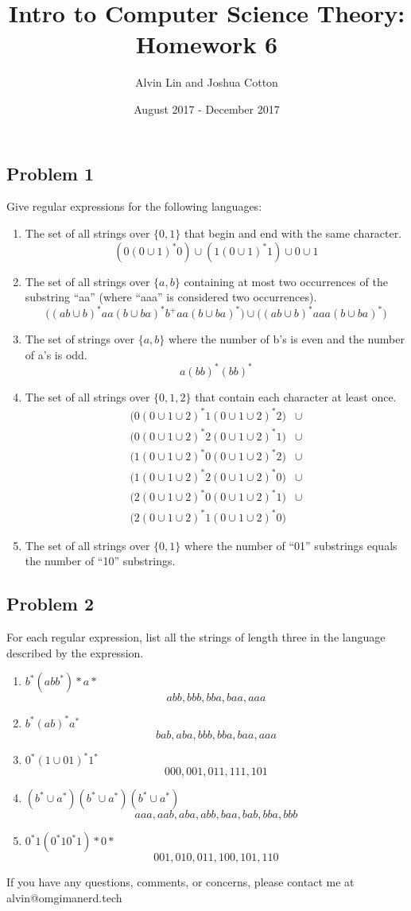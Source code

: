 \documentclass[letterpaper, 12pt]{math}
\title{Intro to Computer Science Theory: Homework 6}
\author{Alvin Lin and Joshua Cotton}
\date{August 2017 - December 2017}
\begin{document}
\maketitle

\subsection*{Problem 1}
Give regular expressions for the following languages:
\begin{enumerate}
  \item The set of all strings over \( \{0,1\} \) that begin and end with the
  same character.
  \[ (0(0\cup1)^*0)\cup(1(0\cup1)^*1)\cup0\cup1 \]
  \item The set of all strings over \( \{a,b\} \) containing at most two
  occurrences of the substring ``aa'' (where ``aaa'' is considered two
  occurrences).
  \[ \bigg((ab\cup b)^*aa(b\cup ba)^*b^+aa(b\cup ba)^*\bigg)\cup
    \bigg((ab\cup b)^*aaa(b\cup ba)^*\bigg) \]
  \item The set of strings over \( \{a,b\} \) where the number of b's is even
  and the number of a's is odd.
  \[ a(bb)^*(bb)^* \]
  \item The set of all strings over \( \{0,1,2\} \) that contain each character
  at least once.
  \begin{align*}
    \bigg(0(0\cup1\cup2)^*1(0\cup1\cup2)^*2\bigg) &\cup \\
    \bigg(0(0\cup1\cup2)^*2(0\cup1\cup2)^*1\bigg) &\cup \\
    \bigg(1(0\cup1\cup2)^*0(0\cup1\cup2)^*2\bigg) &\cup \\
    \bigg(1(0\cup1\cup2)^*2(0\cup1\cup2)^*0\bigg) &\cup \\
    \bigg(2(0\cup1\cup2)^*0(0\cup1\cup2)^*1\bigg) &\cup \\
    \bigg(2(0\cup1\cup2)^*1(0\cup1\cup2)^*0\bigg)
  \end{align*}
  \item The set of all strings over \( \{0,1\} \) where the number of ``01''
  substrings equals the number of ``10'' substrings.
\end{enumerate}

\subsection*{Problem 2}
For each regular expression, list all the strings of length three in the
language described by the expression.
\begin{enumerate}
  \item \( b^*(abb^*)*a* \)
  \[ abb, bbb, bba, baa, aaa \]
  \item \( b^*(ab)^*a^* \)
  \[ bab, aba, bbb, bba, baa, aaa \]
  \item \( 0^*(1\cup01)^*1^* \)
  \[ 000, 001, 011, 111, 101 \]
  \item \( (b^*\cup a^*)(b^*\cup a^*)(b^*\cup a^*) \)
  \[ aaa, aab, aba, abb, baa, bab, bba, bbb \]
  \item \( 0^*1(0^*10^*1)*0* \)
  \[ 001, 010, 011, 100, 101, 110 \]
\end{enumerate}

\begin{center}
  If you have any questions, comments, or concerns, please contact me at
  alvin@omgimanerd.tech
\end{center}
\end{document}
